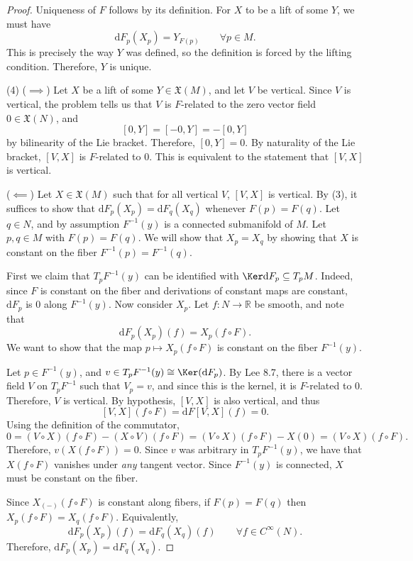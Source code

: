 \documentclass[11pt, letterpaper]{article}
\begin{document}
\begin{proof}
Uniqueness of $F$ follows by its definition. For $X$ to be a lift of some $Y$, we must have
\[
	\mathrm{d} F_p(X_p)=Y_{F(p)} \qquad \forall p\in M
.\]
This is precisely the way $Y$ was defined, so the definition is forced by the lifting condition. Therefore, $Y$ is unique.

(4) ($\implies $) Let $X$ be a lift of some $Y\in \mathfrak{X} (M)$, and let $V$ be vertical. Since $V$ is vertical, the problem tells us that $V$ is $F$-related to the zero vector field $0\in \mathfrak{X} (N)$, and
\[
	[0,Y]=[-0,Y]=-[0,Y]
\]
by bilinearity of the Lie bracket. Therefore, $[0,Y]=0$. By naturality of the Lie bracket, $[V,X]$ is $F$-related to $0$. This is equivalent to the statement that $[V,X]$ is vertical.

($\impliedby $) Let $X\in \mathfrak{X}(M) $ such that for all vertical $V$, $[V,X]$ is vertical. By (3), it suffices to show that $\mathrm{d} F_p(X_p)=\mathrm{d} F_q(X_q)$ whenever $F(p)=F(q)$. Let $q\in N$, and by assumption $F^{-1} (y)$ is a connected submanifold of $M$. Let $p,q\in M$ with $F(p)=F(q)$. We will show that $X_p=X_q$ by showing that $X$ is constant on the fiber $F^{-1} (p)=F^{-1} (q)$. 

First we claim that $T_pF^{-1} (y)$ can be identified with $\Ker \mathrm{d} F_p\subseteq T_pM$. Indeed, since $F$ is constant on the fiber and derivations of constant maps are constant, $\mathrm{d} F_p$ is 0 along $F^{-1} (y)$. Now consider $X_p$. Let $f : N \to \mathbb{R} $ be smooth, and note that
\[
	\mathrm{d} F_p(X_p)(f)=X_p(f\circ F).
\]
We want to show that the map $p\mapsto X_p(f\circ F)$ is constant on the fiber $F^{-1} (y)$.

Let $p\in F^{-1} (y)$, and $v\in T_pF^{-1} (y) \cong  \Ker (\mathrm{d} F_p)$. By Lee 8.7, there is a vector field $V$ on $T_pF^{-1} $ such that $V_p=v$, and since this is the kernel, it is $F$-related to 0. Therefore, $V$ is vertical. By hypothesis, $[V,X]$ is also vertical, and thus
\[
	[V,X](f\circ F)=\mathrm{d} F[V,X](f)=0
.\]
Using the definition of the commutator,
\[
	0=(V\circ X)(f\circ F)-(X\circ V)(f\circ F)=(V\circ X)(f\circ F)-X(0)=(V\circ X)(f\circ F)
.\]
Therefore, $v(X(f\circ F))=0$. Since $v$ was arbitrary in $T_pF^{-1} (y)$, we have that $X(f\circ F)$ vanishes under \emph{any} tangent vector. Since $F^{-1} (y)$ is connected, $X$ must be constant on the fiber.

Since $X_{(-)}(f\circ F)$ is constant along fibers, if $F(p)=F(q)$ then $X_p(f\circ F)=X_q(f\circ F)$. Equivalently,
\[
	\mathrm{d} F_p(X_p)(f)=\mathrm{d} F_q(X_q)(f)\qquad \forall f\in C^\infty (N)
.\]
Therefore, $\mathrm{d} F_p(X_p)=\mathrm{d} F_q(X_q)$.
\end{proof}
\end{document}
